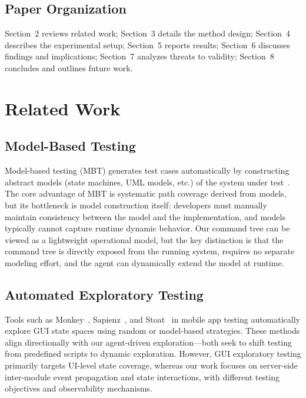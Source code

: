 \documentclass[sigconf,nonacm]{acmart}
\begin{document}
\subsection{Paper Organization}

Section~2 reviews related work; Section~3 details the method design; Section~4 describes the experimental setup; Section~5 reports results; Section~6 discusses findings and implications; Section~7 analyzes threats to validity; Section~8 concludes and outlines future work.

\section{Related Work}

\subsection{Model-Based Testing}

Model-based testing (MBT) generates test cases automatically by constructing abstract models (state machines, UML models, etc.) of the system under test~\cite{utting2012taxonomy,grieskamp2006mbt}. The core advantage of MBT is systematic path coverage derived from models, but its bottleneck is model construction itself: developers must manually maintain consistency between the model and the implementation, and models typically cannot capture runtime dynamic behavior. Our command tree can be viewed as a lightweight operational model, but the key distinction is that the command tree is directly exposed from the running system, requires no separate modeling effort, and the agent can dynamically extend the model at runtime.

\subsection{Automated Exploratory Testing}

Tools such as Monkey~\cite{google2023monkey}, Sapienz~\cite{mao2016sapienz}, and Stoat~\cite{su2017stoat} in mobile app testing automatically explore GUI state spaces using random or model-based strategies. These methods align directionally with our agent-driven exploration---both seek to shift testing from predefined scripts to dynamic exploration. However, GUI exploratory testing primarily targets UI-level state coverage, whereas our work focuses on server-side inter-module event propagation and state interactions, with different testing objectives and observability mechanisms.
\end{document}
